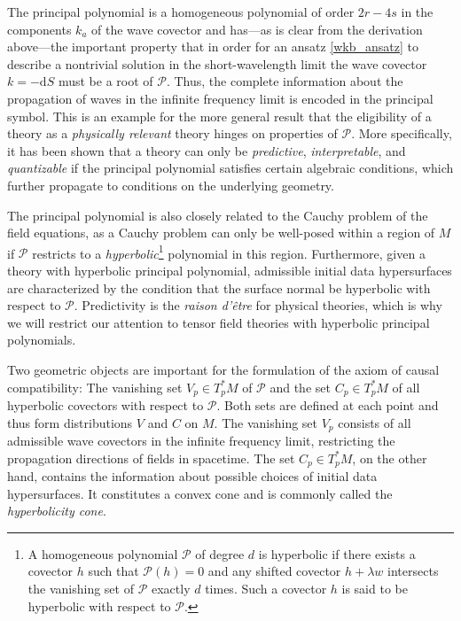 The principal polynomial is a homogeneous polynomial of order $2r-4s$ in the components $k_a$ of the wave covector and has---as is clear from the derivation above---the important property that in order for an ansatz \eqref{wkb_ansatz} to describe a nontrivial solution in the short-wavelength limit the wave covector $k=-\mathrm dS$ must be a root of $\mathcal P$. Thus, the complete information about the propagation of waves in the infinite frequency limit is encoded in the principal symbol. This is an example for the more general result that the eligibility of a theory as a \emph{physically relevant} theory hinges on properties of $\mathcal P$. More specifically, it has been shown that a theory can only be \emph{predictive}, \emph{interpretable}, and \emph{quantizable} if the principal polynomial satisfies certain algebraic conditions, which further propagate to conditions on the underlying geometry.\cite{R_tzel_2011,Rivera_2012}

The principal polynomial is also closely related to the Cauchy problem of the field equations, as a Cauchy problem can only be well-posed within a region of $M$ if $\mathcal P$ restricts to a \emph{hyperbolic}\footnote{A homogeneous polynomial $\mathcal P$ of degree $d$ is hyperbolic if there exists a covector $h$ such that $\mathcal P(h)=0$ and any shifted covector $h+\lambda w$ intersects the vanishing set of $\mathcal P$ exactly $d$ times. Such a covector $h$ is said to be hyperbolic with respect to $\mathcal P$.} polynomial in this region. Furthermore, given a theory with hyperbolic principal polynomial, admissible initial data hypersurfaces are characterized by the condition that the surface normal be hyperbolic with respect to $\mathcal P$.\cite{H_rmander_1977,Ivrii_1974} Predictivity is the \emph{raison d'\^etre} for physical theories, which is why we will restrict our attention to tensor field theories with hyperbolic principal polynomials.

Two geometric objects are important for the formulation of the axiom of causal compatibility: The vanishing set $V_p\in T_p^\ast M$ of $\mathcal P$ and the set $C_p\in T_p^\ast M$ of all hyperbolic covectors with respect to $\mathcal P$. Both sets are defined at each point and thus form distributions $V$ and $C$ on $M$. The vanishing set $V_p$ consists of all admissible wave covectors in the infinite frequency limit, restricting the propagation directions of fields in spacetime. The set $C_p\in T_p^\ast M$, on the other hand, contains the information about possible choices of initial data hypersurfaces. It constitutes a convex cone\cite{Garding_1959} and is commonly called the \emph{hyperbolicity cone}\cite{R_tzel_2011,Rivera_2012}.

